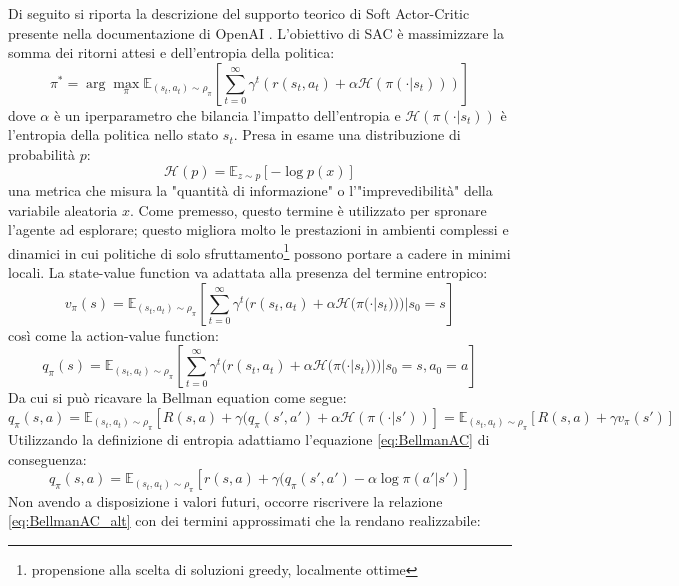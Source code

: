Di seguito si riporta la descrizione del supporto teorico di Soft Actor-Critic presente nella documentazione di OpenAI \cite{openaiSAC2023}. L'obiettivo di SAC è massimizzare la somma dei ritorni attesi e dell'entropia della politica:
\begin{equation}
    \pi^*= \arg \max_\pi \mathbb{E}_{(s_t,a_t)\sim \rho_\pi}[\sum_{t=0}^\infty\gamma^t (r(s_t,a_t)+ \alpha \mathcal{H}(\pi(\cdot|s_t)))]
\end{equation}
dove $\alpha$ è un iperparametro che bilancia l'impatto dell'entropia e $\mathcal{H}(\pi(\cdot|s_t))$ è l'entropia della politica nello stato $s_t$. Presa in esame una distribuzione di probabilità $p$:
\begin{equation}
    \mathcal{H}(p)= \mathbb{E}_{z\sim p}[-\log p(x)]
\end{equation}
una metrica che misura la "quantità di informazione" o l'"imprevedibilità" della variabile aleatoria $x$. Come premesso, questo termine è utilizzato per spronare l'agente ad esplorare; questo migliora molto le prestazioni in ambienti complessi e dinamici in cui politiche di solo sfruttamento\footnote{propensione alla scelta di soluzioni greedy, localmente ottime} possono portare a cadere in minimi locali. La state-value function va adattata alla presenza del termine entropico:
\begin{equation}
    v_\pi(s)= \mathbb{E}_{(s_t,a_t)\sim \rho_\pi}[\sum_{t=0}^\infty \gamma^t(r(s_t,a_t)+ \alpha \mathcal{H}(\pi(\cdot|s_t)))|s_0=s]
\end{equation}
così come la action-value function:
\begin{equation}
    q_\pi(s)= \mathbb{E}_{(s_t,a_t)\sim \rho_\pi}[\sum_{t=0}^\infty \gamma^t(r(s_t,a_t)+ \alpha \mathcal{H}(\pi(\cdot|s_t)))|s_0=s,a_0=a]
\end{equation}
Da cui si può ricavare la Bellman equation come segue:
\begin{equation}
    q_\pi(s,a) =  \mathbb{E}_{(s_t,a_t)\sim \rho_\pi}[R(s,a)+\gamma(q_\pi(s',a')+\alpha \mathcal{H}(\pi(\cdot|s'))]= \mathbb{E}_{(s_t,a_t)\sim \rho_\pi}[R(s,a)+\gamma v_\pi(s')]
    \label{eq:BellmanAC}
\end{equation}
Utilizzando la definizione di entropia adattiamo l'equazione \ref{eq:BellmanAC} di conseguenza:
\begin{equation}
    q_\pi(s,a) =  \mathbb{E}_{(s_t,a_t)\sim \rho_\pi}[r(s,a)+\gamma(q_\pi(s',a')-\alpha \log\pi(a'|s')]
    \label{eq:BellmanAC_alt}
\end{equation}
Non avendo a disposizione i valori futuri, occorre riscrivere la relazione \ref{eq:BellmanAC_alt} con dei termini approssimati che la rendano realizzabile:
